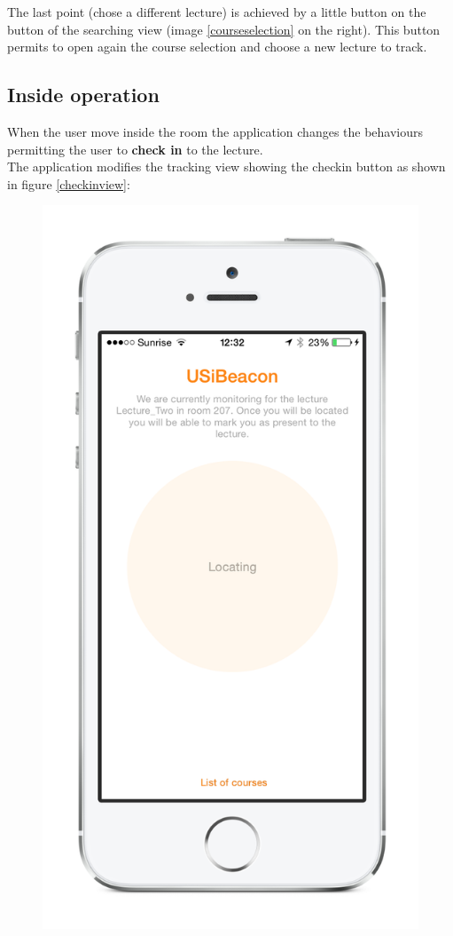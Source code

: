 The last point (chose a different lecture) is achieved by a little button on the button of the searching view (image \ref{courseselection} on the right). This button permits to open again the course selection and choose a new lecture to track.

\subsection{Inside operation}
When the user move inside the room the application changes the behaviours permitting the user to \textbf{check in} to the lecture.\\

The application modifies the tracking view showing the checkin button as shown in figure \ref{checkinview}:

\begin{figure}[htbp]
\begin{center}
\includegraphics[scale=0.5]{img/iphone_locating.png}

\end{center}
\end{figure}

